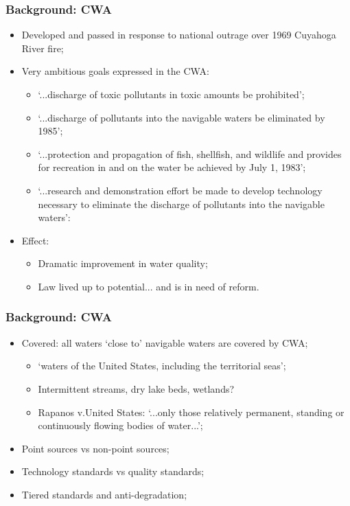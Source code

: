 \documentclass[aspectratio=169]{beamer}
\theoremstyle{principle}
\begin{document}
\begin{frame}
\frametitle{Background: CWA}

\begin{itemize}

\item Developed and passed in response to national outrage over 1969 Cuyahoga River fire;
\bigskip
\bigskip
\item Very ambitious goals expressed in the CWA:
\begin{itemize}
\item `...discharge of toxic pollutants in toxic amounts be prohibited';
\item `...discharge of pollutants into the navigable waters be eliminated by 1985';
\item `...protection and propagation of fish, shellfish, and wildlife and provides for recreation in and 
on the water be achieved by July 1, 1983';
\item `...research and demonstration effort be made to develop 
technology necessary to eliminate the discharge of pollutants into the navigable waters':
\end{itemize}
\bigskip
\bigskip
\item Effect:
\begin{itemize}
\item Dramatic improvement in water quality;
\item Law lived up to potential... and is in need of reform.
\end{itemize}
\end{itemize}

\end{frame}

\begin{frame}
\frametitle{Background: CWA}

\begin{itemize}

\item Covered: all waters `close to' navigable waters are covered by CWA;
\begin{itemize}
\item `waters of the United States, including the territorial seas';
\item Intermittent streams, dry lake beds, wetlands?
\item Rapanos v.United States: `...only those relatively permanent, standing or continuously flowing bodies of water...';
\end{itemize}
\bigskip
\item Point sources vs non-point sources;
\bigskip
\item Technology standards vs quality standards;
\bigskip
\item Tiered standards and anti-degradation;

\end{itemize}

\end{frame}
\end{document}

